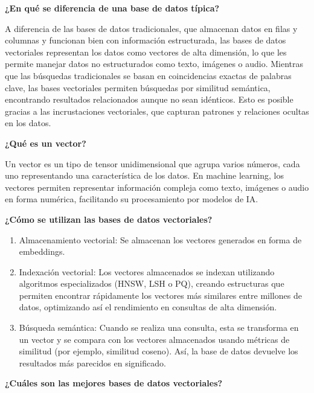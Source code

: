 \documentclass{article}
\begin{document}
\vspace{0.4cm}
\textbf{¿En qué se diferencia de una base de datos típica?} 

A diferencia de las bases de datos tradicionales, que almacenan datos en filas y columnas y funcionan bien con información estructurada, las bases de datos vectoriales representan los datos como vectores de alta dimensión, lo que les permite manejar datos no estructurados como texto, imágenes o audio. Mientras que las búsquedas tradicionales se basan en coincidencias exactas de palabras clave, las bases vectoriales permiten búsquedas por similitud semántica, encontrando resultados relacionados aunque no sean idénticos. Esto es posible gracias a las incrustaciones vectoriales, que capturan patrones y relaciones ocultas en los datos. 

\vspace{0.4cm}
\textbf{¿Qué es un vector?}

Un vector es un tipo de tensor unidimensional que agrupa varios números, cada uno representando una característica de los datos. En machine learning, los vectores permiten representar información compleja como texto, imágenes o audio en forma numérica, facilitando su procesamiento por modelos de IA.

\vspace{0.4cm}
\textbf{¿Cómo se utilizan las bases de datos vectoriales?}

\begin{enumerate}
\item{Almacenamiento vectorial:}
Se almacenan los vectores generados en forma de embeddings.

\item{Indexación vectorial:}
Los vectores almacenados se indexan utilizando algoritmos especializados (HNSW, LSH o PQ), creando estructuras que permiten encontrar rápidamente los vectores más similares entre millones de datos, optimizando así el rendimiento en consultas de alta dimensión.

\item{Búsqueda semántica:}
Cuando se realiza una consulta, esta se transforma en un vector y se compara con los vectores almacenados usando métricas de similitud (por ejemplo, similitud coseno). Así, la base de datos devuelve los resultados más parecidos en significado.

\end{enumerate}

\cite{ibm}

\vspace{0.5cm}
\textbf{¿Cuáles son las mejores bases de datos vectoriales?}
\end{document}
